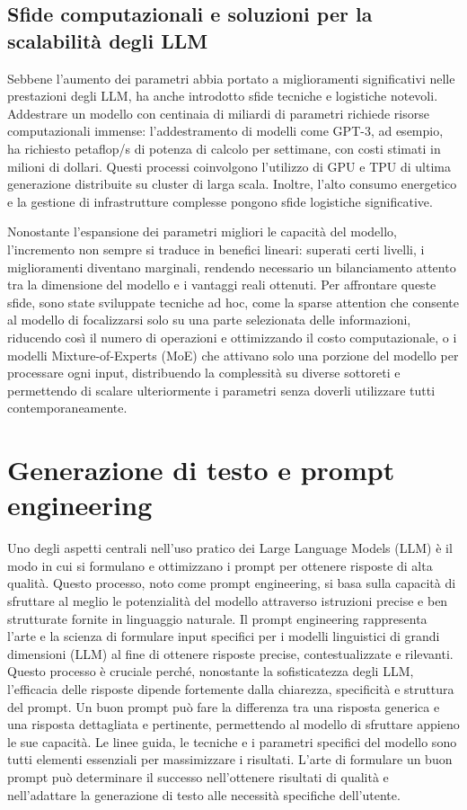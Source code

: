 \documentclass[target=mst,aauheader=,style=]{thud}
\begin{document}
\subsection{Sfide computazionali e soluzioni per la scalabilità degli LLM}
Sebbene l’aumento dei parametri abbia portato a miglioramenti significativi nelle prestazioni degli LLM, ha anche introdotto sfide tecniche e logistiche notevoli. Addestrare un modello con centinaia di miliardi di parametri richiede risorse computazionali immense: l’addestramento di modelli come GPT-3, ad esempio, ha richiesto petaflop/s di potenza di calcolo per settimane, con costi stimati in milioni di dollari. Questi processi coinvolgono l’utilizzo di GPU e TPU di ultima generazione distribuite su cluster di larga scala. Inoltre, l’alto consumo energetico e la gestione di infrastrutture complesse pongono sfide logistiche significative.

Nonostante l’espansione dei parametri migliori le capacità del modello, l’incremento non sempre si traduce in benefici lineari: superati certi livelli, i miglioramenti diventano marginali, rendendo necessario un bilanciamento attento tra la dimensione del modello e i vantaggi reali ottenuti. Per affrontare queste sfide, sono state sviluppate tecniche ad hoc, come la sparse attention che consente al modello di focalizzarsi solo su una parte selezionata delle informazioni, riducendo così il numero di operazioni e ottimizzando il costo computazionale, o i modelli Mixture-of-Experts (MoE) che attivano solo una porzione del modello per processare ogni input, distribuendo la complessità su diverse sottoreti e permettendo di scalare ulteriormente i parametri senza doverli utilizzare tutti contemporaneamente.

\section{Generazione di testo e prompt engineering}
Uno degli aspetti centrali nell’uso pratico dei Large Language Models (LLM) è il modo in cui si formulano e ottimizzano i prompt per ottenere risposte di alta qualità. Questo processo, noto come prompt engineering, si basa sulla capacità di sfruttare al meglio le potenzialità del modello attraverso istruzioni precise e ben strutturate fornite in linguaggio naturale. Il prompt engineering rappresenta l’arte e la scienza di formulare input specifici per i modelli linguistici di grandi dimensioni (LLM) al fine di ottenere risposte precise, contestualizzate e rilevanti. Questo processo è cruciale perché, nonostante la sofisticatezza degli LLM, l'efficacia delle risposte dipende fortemente dalla chiarezza, specificità e struttura del prompt. Un buon prompt può fare la differenza tra una risposta generica e una risposta dettagliata e pertinente, permettendo al modello di sfruttare appieno le sue capacità. Le linee guida, le tecniche e i parametri specifici del modello sono tutti elementi essenziali per massimizzare i risultati. L’arte di formulare un buon prompt può determinare il successo nell’ottenere risultati di qualità e nell’adattare la generazione di testo alle necessità specifiche dell’utente.
\end{document}
